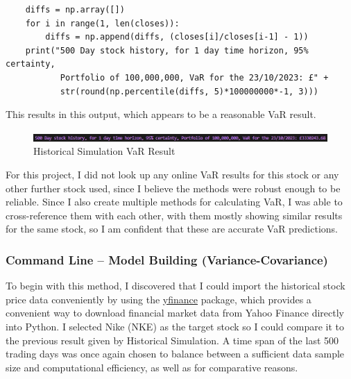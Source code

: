 \documentclass{article}
\begin{document}
  \begin{verbatim}
    diffs = np.array([])
    for i in range(1, len(closes)): 
        diffs = np.append(diffs, (closes[i]/closes[i-1] - 1))
    print("500 Day stock history, for 1 day time horizon, 95% certainty, 
           Portfolio of 100,000,000, VaR for the 23/10/2023: £" + 
           str(round(np.percentile(diffs, 5)*100000000*-1, 3)))
    \end{verbatim}

This results in this output, which appears to be a reasonable VaR result. \\\vspace{0.3cm}

  \begin{figure}[h]
    \centering
    \includegraphics[width=1\textwidth]{Images/Historical Command Line Result.png}
    \caption{Historical Simulation VaR Result}
    \label{fig:Historical Command Line Result}
  \end{figure}

For this project, I did not look up any online VaR results for this stock or any other further stock used, since I believe the methods were robust enough to be reliable. Since I also create multiple methods for calculating VaR, I was able to cross-reference them with each other, with them mostly showing similar results for the same stock, so I am confident that 
these are accurate VaR predictions.

\subsubsection{Command Line -- Model Building  (Variance-Covariance)}

To begin with this method, I discovered that I could import the historical stock price data conveniently by using the \href{https://pypi.org/project/yfinance/}{yfinance} package, which provides a convenient way to download financial market data from Yahoo Finance directly into Python. I selected Nike (NKE) as the target stock so I could compare it to the previous result given by Historical Simulation. A time span of the last 500 trading days was once again chosen to balance between a sufficient data sample size and computational efficiency, as well as for comparative reasons.\\\vspace{0.3cm}
\end{document}
